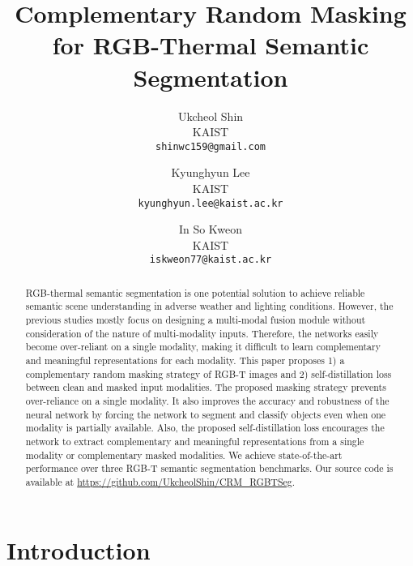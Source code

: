 \documentclass[10pt,twocolumn,letterpaper]{article}
\begin{document}
\title{Complementary Random Masking for RGB-Thermal Semantic Segmentation}

\author{Ukcheol Shin\\
KAIST\\
{\tt\small shinwc159@gmail.com}
\and
Kyunghyun Lee\\
KAIST\\
{\tt\small kyunghyun.lee@kaist.ac.kr}
\and
In So Kweon\\
KAIST\\
{\tt\small iskweon77@kaist.ac.kr}
}



\maketitle
\ificcvfinal\thispagestyle{empty}\fi

\begin{abstract}
RGB-thermal semantic segmentation is one potential solution to achieve reliable semantic scene understanding in adverse weather and lighting conditions.
However, the previous studies mostly focus on designing a multi-modal fusion module without consideration of the nature of multi-modality inputs.
Therefore, the networks easily become over-reliant on a single modality, making it difficult to learn complementary and meaningful representations for each modality.
This paper proposes 1) a complementary random masking strategy of RGB-T images and 2) self-distillation loss between clean and masked input modalities.
The proposed masking strategy prevents over-reliance on a single modality.
It also improves the accuracy and robustness of the neural network by forcing the network to segment and classify objects even when one modality is partially available.
Also, the proposed self-distillation loss encourages the network to extract complementary and meaningful representations from a single modality or complementary masked modalities.
We achieve state-of-the-art performance over three RGB-T semantic segmentation benchmarks.
Our source code is available at \url{https://github.com/UkcheolShin/CRM_RGBTSeg}.
\end{abstract}




\section{Introduction}
\label{sec:intro}
\end{document}
